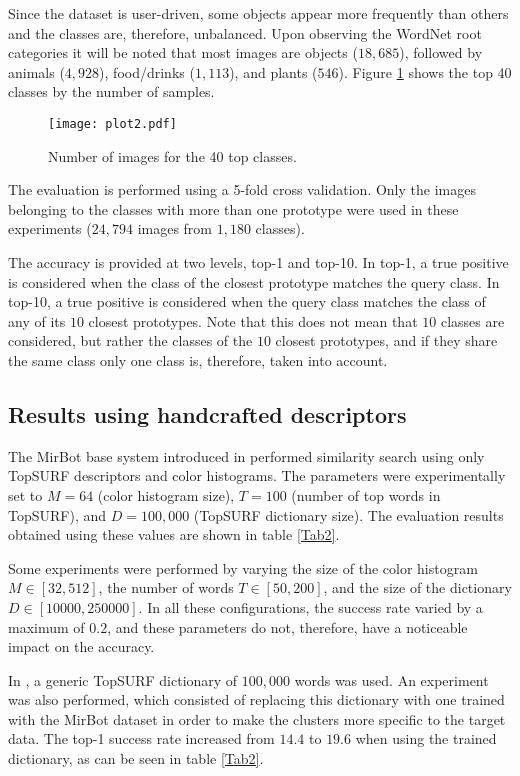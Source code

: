 \documentclass[final, twocolumn]{elsarticle}
\begin{document}
Since the dataset is user-driven, some objects appear more frequently than others and the classes are, therefore, unbalanced. Upon observing the WordNet root categories it will be noted that most images are objects ($18,685$), followed by animals ($4,928$), food/drinks ($1,113$), and plants ($546$). Figure \ref{Plot2} shows the top 40 classes by the number of samples.

\begin{figure}[ht]
\center
\texttt{[image: plot2.pdf]}
\caption{\label{Plot2}Number of images for the 40 top classes. }
\end{figure}

The evaluation is performed using a 5-fold cross validation. Only the images belonging to the classes with more than one prototype were used in these experiments ($24,794$ images from $1,180$ classes).

The accuracy is provided at two levels, top-1 and top-10. In top-1, a true positive is considered when the class of the closest prototype matches the query class. In top-10, a true positive is considered when the query class matches the class of any of its $10$ closest prototypes. Note that this does not mean that $10$ classes are considered, but rather the classes of the $10$ closest prototypes, and if they share the same class only one class is, therefore, taken into account.


\subsection{Results using handcrafted descriptors}

The MirBot base system introduced in \cite{MirBot:System} performed similarity search using only TopSURF descriptors and color histograms. The parameters were experimentally set to $M=64$ (color histogram size), $T=100$ (number of top words in TopSURF), and $D=100,000$ (TopSURF dictionary size). The evaluation results obtained using these values are shown in table \ref{Tab2}.

Some experiments were performed by varying the size of the color histogram $M \in [32,512]$, the number of words $T\in [50,200]$, and the size of the dictionary $D\in [10000, 250000]$. In all these configurations, the success rate varied by a maximum of $0.2$, and these parameters do not, therefore, have a noticeable impact on the accuracy.

In \cite{MirBot:System}, a generic TopSURF dictionary of $100,000$ words was used. An experiment was also performed, which consisted of replacing this dictionary with one trained with the MirBot dataset in order to make the clusters more specific to the target data. The top-1 success rate increased from $14.4$ to $19.6$ when using the trained dictionary, as can be seen in table \ref{Tab2}.
\end{document}
